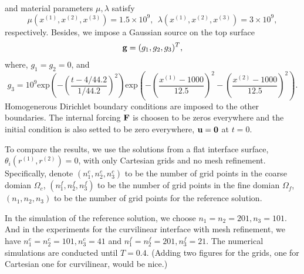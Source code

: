 \documentclass[a4paper]{article}
\begin{document}
and material parameters $\mu, \lambda$ satisfy
\begin{equation}
\mu(x^{(1)},x^{(2)},x^{(3)}) = 1.5\times 10^9,\ \ 
\lambda(x^{(1)},x^{(2)},x^{(3)})  = 3\times 10^9,
\end{equation}
respectively. Besides, we impose a Gaussian source on the top surface
\[{\bf g} = (g_1,g_2,g_3)^T ,\]
where, $g_1 = g_2 = 0$, and 
\[g_3 = 10^9 \text{exp}\left(-\left(\frac{t-4/44.2}{1/44.2}\right)^2\right)\text{exp}\left(-\left(\frac{x^{(1)}-1000}{12.5}\right)^2-\left(\frac{x^{(2)}-1000}{12.5}\right)^2\right).\]
Homogenerous Dirichlet boundary conditions are imposed to the other boundaries. The internal forcing ${\bf F}$ is choosen to be zeros everywhere and the initial condition is also setted to be zero everywhere, ${\bf u} = {\bf 0}$ at $t = 0$.

To compare the results, we use the solutions from a flat interface surface, $\theta_i(r^{(1)},r^{(2)}) = 0$, with only Cartesian grids and no mesh refinement. Specifically, denote $(n_1^c,n_2^c,n_3^c)$ to be the number of grid points in the coarse domian $\Omega_c$, $(n_1^f,n_2^f,n_3^f)$ to be the number of grid points in the fine domian $\Omega_f$, $(n_1,n_2,n_3)$ to be the number of grid points for the reference solution.

In the simulation of the reference solution, we choose $n_1 = n_2 = 201, n_3 = 101$. And in the experiments for the curvilinear interface with mesh refinement, we have $n_1^c = n_2^c = 101, n_3^c = 41$ and $n_1^f = n_2^f = 201, n_3^f = 21$. The numerical simulations are conducted until $T = 0.4$. {\color{red}(Adding two figures for the grids, one for Cartesian one for curvilinear, would be nice.)}
\end{document}
